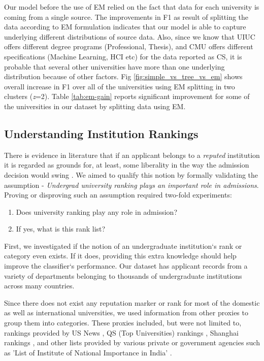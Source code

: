 \documentclass{sig-alternate-05-2015}
\begin{document}
Our model before the use of EM relied on the fact that data for each university is coming from a single source. The improvements in F1 as result of splitting the data according to EM formulation indicates that our model is able to capture underlying different distributions of source data. Also, since we know that UIUC offers different degree programs (Professional, Thesis), and CMU offers different specifications (Machine Learning, HCI etc) for the data reported as CS, it is probable that several other universities have more than one underlying distribution because of other factors. Fig \ref{fig:simple_vs_tree_vs_em} shows overall increase in F1 over all of the universities using EM splitting in two clusters (\textit{z}=2). Table \ref{tab:em-gain} reports significant improvement for some of the universities in our dataset by splitting data using EM.



\subsection{Understanding Institution Rankings}
\label{subsec:ranking-exp}
There is evidence in literature that if an applicant belongs to a \textit{reputed} institution it  is regarded as grounds for, at least, some liberality in the way the admission decision would swing \cite{dagap}. We aimed to qualify this notion by formally validating the assumption - \textit{Undergrad university ranking plays an important role in admissions}. Proving or disproving such an assumption required two-fold experiments:\\
\begin{enumerate}
\item Does university ranking play any role in admission?
\item If yes, what is this rank list?
\end{enumerate}

First, we investigated if the notion of an undergraduate institution`s rank or category even exists. If it does, providing this extra knowledge should help improve the classifier`s performance. Our dataset has applicant records from a variety of departments belonging to thousands of undergraduate institutions across many countries. 

Since there does not exist any reputation marker or rank for most of the domestic as well as international universities, we used information from other proxies to group them into categories. These proxies included, but were not limited to, rankings provided by US News \cite{usnews}, QS (Top Universities) rankings \cite{qs}, Shanghai rankings \cite{shanghai}, and other lists provided by various private or government agencies such as 'List of Institute of National Importance in India' \cite{national-importance}.
\end{document}

